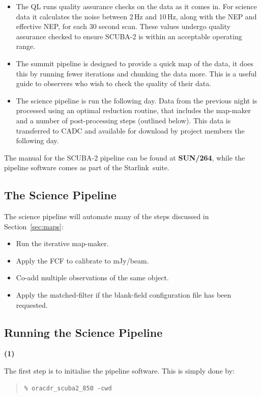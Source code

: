 \documentclass[twoside,11pt]{article}
\newcommand{\htmladdnormallink}[2]{#1}
\newcommand{\htmlref}[2]{#1}
\newcommand{\latexhtml}[2]{#1}
\newcommand{\xref}[3]{#1}
\newcommand{\xlabel}[1]{}
\renewcommand{\_}{\texttt{\symbol{95}}}
\newenvironment{myquote}{\begin{quote}\begin{small}}{\end{small}\end{quote}}
\newcommand{\starlink}{\htmladdnormallink{Starlink}{http://starlink.jach.hawaii.edu}}
\newcommand{\pipelinesun}{\xref{\textbf{SUN/264}}{sun264}{}}
\newcommand{\cref}[3]{\latexhtml{#1~\ref{#2}}{\htmlref{#3}{#2}}}
\begin{document}
\begin{itemize}
\item The QL runs quality assurance checks on the data as it comes in.
For science data it calculates the noise between 2\,Hz and 10\,Hz,
along with the NEP and effective NEP, for each 30 second scan. These
values undergo quality assurance checked to ensure SCUBA-2 is within
an acceptable operating range.
\item The summit pipeline is designed to provide a quick map of the
data, it does this by running fewer iterations and chunking the data
more. This is a useful guide to observers who wish to check the
quality of their data.
\item The science pipeline is run the following day. Data from the
previous night is processed using an optimal reduction routine, that
includes the map-maker and a number of post-processing steps (outlined
below).  This data is transferred to CADC and available for download
by project members the following day.
\end{itemize}

The manual for the SCUBA-2 pipeline can be found at \pipelinesun,
while the pipeline software comes as part of the \starlink\ suite.


\subsection{\xlabel{science_pl}The Science Pipeline}
The science pipeline will automate many of the steps discussed in
\cref{Section}{sec:maps}{Reducing your data}:
\vspace{-0.3cm}
\begin{itemize}\itemsep-0.3em
\item Run the iterative map-maker.
\item Apply the FCF to calibrate to mJy/beam.
\item Co-add multiple observations of the same object.
\item Apply the matched-filter if the blank-field configuration file
      has been requested.
\end{itemize}

\subsection{\xlabel{running_pl}Running the Science Pipeline}
\begin{minipage}[t]{0.05\linewidth}
\textbf{(1)}
\end{minipage}
\begin{minipage}[t]{0.95\linewidth}
The first step is to initialise the pipeline software. This is simply done by:
\begin{myquote}
\begin{verbatim}
% oracdr_scuba2_850 -cwd

\end{verbatim}
\end{myquote}
\end{minipage}
\end{document}
